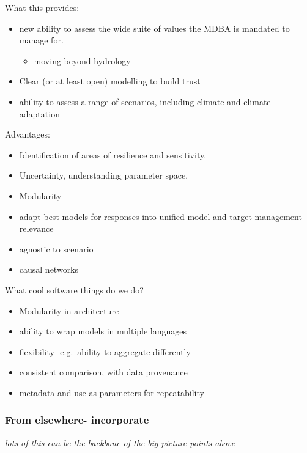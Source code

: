 \documentclass[
  number]{elsarticle}
\providecommand{\tightlist}{%
  \setlength{\itemsep}{0pt}\setlength{\parskip}{0pt}}\usepackage{longtable,booktabs,array}
\begin{document}
What this provides:

\begin{itemize}
\item
  new ability to assess the wide suite of values the MDBA is mandated to
  manage for.

  \begin{itemize}
  \tightlist
  \item
    moving beyond hydrology
  \end{itemize}
\item
  Clear (or at least open) modelling to build trust
\item
  ability to assess a range of scenarios, including climate and climate
  adaptation
\end{itemize}

Advantages:

\begin{itemize}
\item
  Identification of areas of resilience and sensitivity.
\item
  Uncertainty, understanding parameter space.
\item
  Modularity
\item
  adapt best models for responses into unified model and target
  management relevance
\item
  agnostic to scenario
\item
  causal networks
\end{itemize}

What cool software things do we do?

\begin{itemize}
\item
  Modularity in architecture
\item
  ability to wrap models in multiple languages
\item
  flexibility- e.g.~ability to aggregate differently
\item
  consistent comparison, with data provenance
\item
  metadata and use as parameters for repeatability
\end{itemize}

\hypertarget{from-elsewhere--incorporate}{%
\subsubsection{From elsewhere-
incorporate}\label{from-elsewhere--incorporate}}

\emph{lots of this can be the backbone of the big-picture points above}
\end{document}
